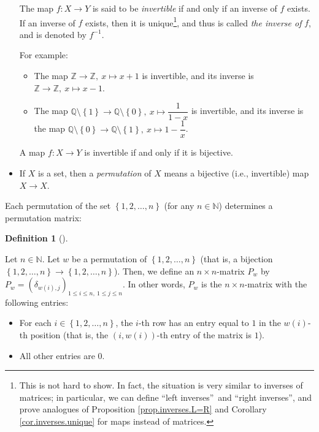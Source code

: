 \documentclass[numbers=enddot,12pt,final,onecolumn,notitlepage]{scrartcl}%
\theoremstyle{definition}
\newtheorem{defi}[theo]{Definition}
\newenvironment{definition}[1][]
{\begin{defi}[#1]\begin{leftbar}}
{\end{leftbar}\end{defi}}
\begin{document}
\begin{itemize}
The map $f:X\rightarrow Y$ is said to be \textit{invertible} if and only if an
inverse of $f$ exists. If an inverse of $f$ exists, then it is
unique\footnote{This is not hard to show. In fact, the situation is very
similar to inverses of matrices; in particular, we can define
\textquotedblleft left inverses\textquotedblright\ and \textquotedblleft right
inverses\textquotedblright, and prove analogues of Proposition
\ref{prop.inverses.L=R} and Corollary \ref{cor.inverses.unique} for maps
instead of matrices.}, and thus is called \textit{the inverse of }$f$, and is
denoted by $f^{-1}$.

For example:

\begin{itemize}
\item The map $\mathbb{Z}\rightarrow\mathbb{Z},\ x\mapsto x+1$ is invertible,
and its inverse is $\mathbb{Z}\rightarrow\mathbb{Z},\ x\mapsto x-1$.

\item The map $\mathbb{Q}\setminus\left\{  1\right\}  \rightarrow
\mathbb{Q}\setminus\left\{  0\right\}  ,\ x\mapsto\dfrac{1}{1-x}$ is
invertible, and its inverse is the map $\mathbb{Q}\setminus\left\{  0\right\}
\rightarrow\mathbb{Q}\setminus\left\{  1\right\}  ,\ x\mapsto1-\dfrac{1}{x}$.
\end{itemize}

A map $f:X\rightarrow Y$ is invertible if and only if it is bijective.

\item If $X$ is a set, then a \textit{permutation} of $X$ means a bijective
(i.e., invertible) map $X\rightarrow X$.
\end{itemize}

Each permutation of the set $\left\{  1,2,\ldots,n\right\}  $ (for any
$n\in\mathbb{N}$) determines a permutation matrix:

\begin{definition}
\label{def.permat.permat-from-perm}Let $n\in\mathbb{N}$. Let $w$ be a
permutation of $\left\{  1,2,\ldots,n\right\}  $ (that is, a bijection
$\left\{  1,2,\ldots,n\right\}  \rightarrow\left\{  1,2,\ldots,n\right\}  $).
Then, we define an $n\times n$-matrix $P_{w}$ by $P_{w}=\left(  \delta
_{w\left(  i\right)  ,j}\right)  _{1\leq i\leq n,\ 1\leq j\leq n}$. In other
words, $P_{w}$ is the $n\times n$-matrix with the following entries:

\begin{itemize}
\item For each $i\in\left\{  1,2,\ldots,n\right\}  $, the $i$-th row has an
entry equal to $1$ in the $w\left(  i\right)  $-th position (that is, the
$\left(  i,w\left(  i\right)  \right)  $-th entry of the matrix is $1$).

\item All other entries are $0$.
\end{itemize}
\end{definition}
\end{document}
